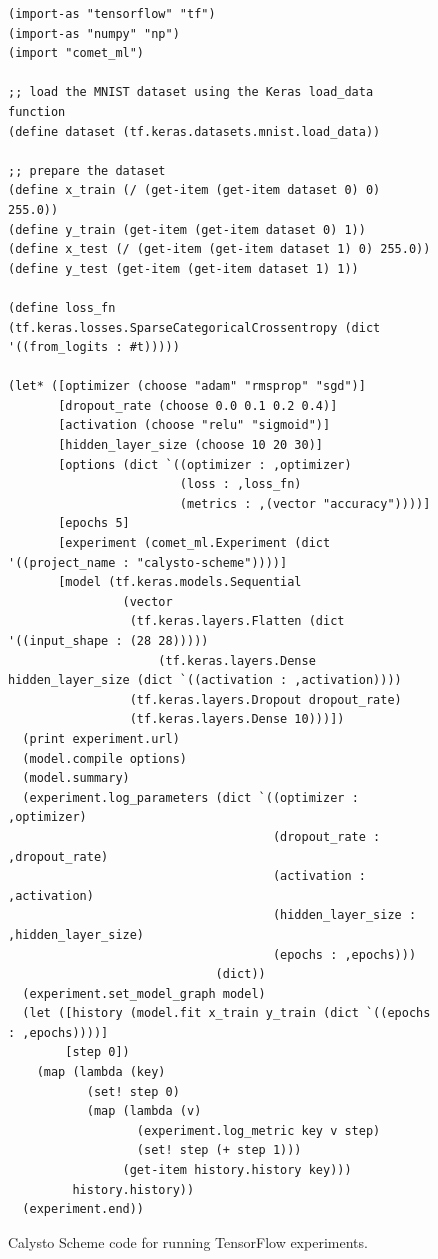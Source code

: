 \documentclass[acmsmall,screen,authorversion]{acmart}
\begin{document}

\begin{figure}[h]
\begin{minipage}{0.8\textwidth}
{\scriptsize
\begin{verbatim}
(import-as "tensorflow" "tf")
(import-as "numpy" "np")
(import "comet_ml")

;; load the MNIST dataset using the Keras load_data function
(define dataset (tf.keras.datasets.mnist.load_data))

;; prepare the dataset
(define x_train (/ (get-item (get-item dataset 0) 0) 255.0))
(define y_train (get-item (get-item dataset 0) 1))
(define x_test (/ (get-item (get-item dataset 1) 0) 255.0))
(define y_test (get-item (get-item dataset 1) 1))

(define loss_fn (tf.keras.losses.SparseCategoricalCrossentropy (dict '((from_logits : #t)))))

(let* ([optimizer (choose "adam" "rmsprop" "sgd")]
       [dropout_rate (choose 0.0 0.1 0.2 0.4)]
       [activation (choose "relu" "sigmoid")]
       [hidden_layer_size (choose 10 20 30)]
       [options (dict `((optimizer : ,optimizer)
                        (loss : ,loss_fn)
                        (metrics : ,(vector "accuracy"))))]
       [epochs 5]
       [experiment (comet_ml.Experiment (dict '((project_name : "calysto-scheme"))))]
       [model (tf.keras.models.Sequential 
                (vector
                 (tf.keras.layers.Flatten (dict '((input_shape : (28 28)))))
                     (tf.keras.layers.Dense hidden_layer_size (dict `((activation : ,activation))))
                 (tf.keras.layers.Dropout dropout_rate)
                 (tf.keras.layers.Dense 10)))])
  (print experiment.url)
  (model.compile options)
  (model.summary)
  (experiment.log_parameters (dict `((optimizer : ,optimizer)
                                     (dropout_rate : ,dropout_rate)
                                     (activation : ,activation)
                                     (hidden_layer_size : ,hidden_layer_size)
                                     (epochs : ,epochs)))
                             (dict))
  (experiment.set_model_graph model)
  (let ([history (model.fit x_train y_train (dict `((epochs : ,epochs))))]
        [step 0])
    (map (lambda (key)
           (set! step 0)
           (map (lambda (v)
                  (experiment.log_metric key v step)
                  (set! step (+ step 1)))
                (get-item history.history key)))
         history.history))
  (experiment.end))
\end{verbatim}
}
\end{minipage}
\caption{Calysto Scheme code for running TensorFlow experiments.}
\label{fig:tensorflow}
\end{figure}
\end{document}
